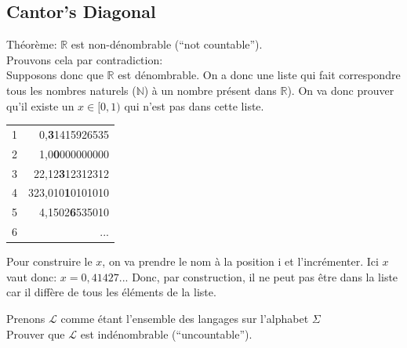 \documentclass[a4paper,12pt]{article}
\begin{document}
  \subsection{Cantor's Diagonal}
    Théorème: $\mathbb{R}$ est non-dénombrable (``not countable'').\\
    Prouvons cela par contradiction:\\
    Supposons donc que $\mathbb{R}$ est dénombrable.  On a donc une liste qui fait correspondre tous les nombres naturels ($\mathbb{N}$) à un nombre présent dans $\mathbb{R}$).  On va donc prouver qu'il existe un $x \in [0, 1)$ qui n'est pas dans cette liste.
    \begin{table}[h]
      \centering
      \begin{tabular}{lr}
      \multicolumn{1}{l|}{1} & 0,\textbf{3}1415926535   \\
      \multicolumn{1}{l|}{2} & 1,0\textbf{0}000000000   \\
      \multicolumn{1}{l|}{3} & 22,12\textbf{3}12312312  \\
      \multicolumn{1}{l|}{4} & 323,010\textbf{1}0101010 \\
      \multicolumn{1}{l|}{5} & 4,1502\textbf{6}535010	\\
      \multicolumn{1}{l|}{6} & ...
      \end{tabular}
    \end{table}
    Pour construire le $x$, on va prendre le nom à la position i et l'incrémenter.  Ici $x$ vaut donc:
    $x = 0,41427...$  Donc, par construction, il ne peut pas être dans la liste car il diffère de tous les éléments de la liste.

  Prenons $\mathcal{L}$ comme étant l'ensemble des langages sur l'alphabet $\Sigma$\\
  Prouver que $\mathcal{L}$ est indénombrable (``uncountable'').
\end{document}
